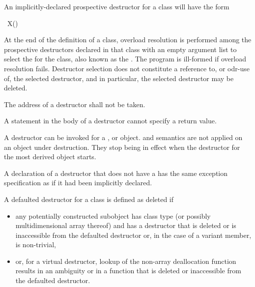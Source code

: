\pnum
An implicitly-declared prospective destructor for a class  will have the form
\begin{codeblock}
~X()
\end{codeblock}

\pnum
At the end of the definition of a class,
overload resolution is performed
among the prospective destructors declared in that class
with an empty argument list
to select the  for the class,
also known as the .
The program is ill-formed if overload resolution fails.
Destructor selection does not constitute
a reference to,
or odr-use of,
the selected destructor,
and in particular,
the selected destructor may be deleted.

\pnum
{}%
The address of a destructor shall not be taken.
%
\begin{note}
A  statement in the body of a destructor
cannot specify a return value.
\end{note}
%
%
A destructor can be invoked for a
,
or
object.
and
semantics are not applied on an object under destruction.
They stop being in effect when the destructor for the
most derived object starts.

\pnum
\begin{note}
A declaration of a destructor that does not have a 
has the same exception specification as if it had been implicitly declared.
\end{note}

\pnum
A defaulted destructor for a class
   is defined as deleted if
\begin{itemize}
\item any potentially constructed subobject has class type
   (or possibly multidimensional array thereof) and
   has a destructor that is deleted or
  is inaccessible from the defaulted destructor or,
  in the case of a variant member, is non-trivial,

\item or, for a virtual destructor, lookup of the non-array deallocation
  function results in an ambiguity or in a function that is deleted or
  inaccessible from the defaulted destructor.
\end{itemize}

